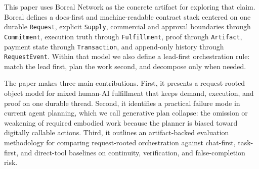 This paper uses Boreal Network as the concrete artifact for exploring that claim. Boreal defines a docs-first and machine-readable contract stack centered on one durable \texttt{Request}, explicit \texttt{Supply}, commercial and approval boundaries through \texttt{Commitment}, execution truth through \texttt{Fulfillment}, proof through \texttt{Artifact}, payment state through \texttt{Transaction}, and append-only history through \texttt{RequestEvent}. Within that model we also define a lead-first orchestration rule: match the lead first, plan the work second, and decompose only when needed.

The paper makes three main contributions. First, it presents a request-rooted object model for mixed human-AI fulfillment that keeps demand, execution, and proof on one durable thread. Second, it identifies a practical failure mode in current agent planning, which we call generative plan collapse: the omission or weakening of required embodied work because the planner is biased toward digitally callable actions. Third, it outlines an artifact-backed evaluation methodology for comparing request-rooted orchestration against chat-first, task-first, and direct-tool baselines on continuity, verification, and false-completion risk.
